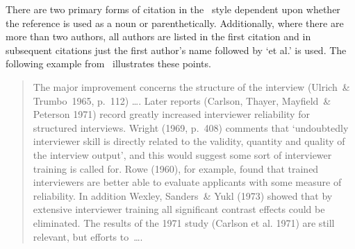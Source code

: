 There are two primary forms of citation in the \harvard\ style dependent
upon whether the reference is used as a noun or parenthetically.
Additionally, where there are more than two authors, all authors are listed in
the first citation and in subsequent citations just the first author's name
followed by `et al.' is used.
The following example from \ illustrates these points.
\begin{quote}
The major improvement concerns the structure of the interview
(Ulrich~\& Trumbo~1965, p.~112) \ldots .
Later reports (Carlson, Thayer, Mayfield~\& Peterson 1971) record greatly 
increased interviewer reliability for structured interviews.
Wright (1969, p.~408) comments that `undoubtedly interviewer skill is
directly related to the validity, quantity and quality of the interview output',
and this would suggest some sort of interviewer training is called for.
Rowe (1960), for example, found that trained interviewers are better able to
evaluate applicants with some measure of reliability.
In addition Wexley, Sanders~\& Yukl (1973) showed that by extensive interviewer
training all significant contrast effects could be eliminated.
The results of the 1971 study (Carlson et al. 1971) are still relevant, but
efforts to~\ldots.
\end{quote}

